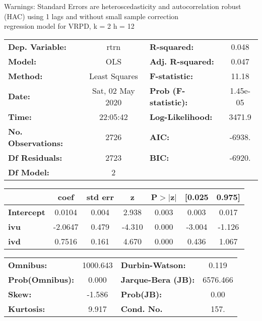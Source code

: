 Warnings: \newline
 [1] Standard Errors are heteroscedasticity and autocorrelation robust (HAC) using 1 lags and without small sample correction\\ 

regression model for VRPD, k = 2 h = 12\begin{center}
\begin{tabular}{lclc}
\toprule
\textbf{Dep. Variable:}    &       rtrn       & \textbf{  R-squared:         } &     0.048   \\
\textbf{Model:}            &       OLS        & \textbf{  Adj. R-squared:    } &     0.047   \\
\textbf{Method:}           &  Least Squares   & \textbf{  F-statistic:       } &     11.18   \\
\textbf{Date:}             & Sat, 02 May 2020 & \textbf{  Prob (F-statistic):} &  1.45e-05   \\
\textbf{Time:}             &     22:05:42     & \textbf{  Log-Likelihood:    } &    3471.9   \\
\textbf{No. Observations:} &        2726      & \textbf{  AIC:               } &    -6938.   \\
\textbf{Df Residuals:}     &        2723      & \textbf{  BIC:               } &    -6920.   \\
\textbf{Df Model:}         &           2      & \textbf{                     } &             \\
\bottomrule
\end{tabular}
\begin{tabular}{lcccccc}
                   & \textbf{coef} & \textbf{std err} & \textbf{z} & \textbf{P$> |$z$|$} & \textbf{[0.025} & \textbf{0.975]}  \\
\midrule
\textbf{Intercept} &       0.0104  &        0.004     &     2.938  &         0.003        &        0.003    &        0.017     \\
\textbf{ivu}       &      -2.0647  &        0.479     &    -4.310  &         0.000        &       -3.004    &       -1.126     \\
\textbf{ivd}       &       0.7516  &        0.161     &     4.670  &         0.000        &        0.436    &        1.067     \\
\bottomrule
\end{tabular}
\begin{tabular}{lclc}
\textbf{Omnibus:}       & 1000.643 & \textbf{  Durbin-Watson:     } &    0.119  \\
\textbf{Prob(Omnibus):} &   0.000  & \textbf{  Jarque-Bera (JB):  } & 6576.466  \\
\textbf{Skew:}          &  -1.586  & \textbf{  Prob(JB):          } &     0.00  \\
\textbf{Kurtosis:}      &   9.917  & \textbf{  Cond. No.          } &     157.  \\
\bottomrule
\end{tabular}
\end{center}

